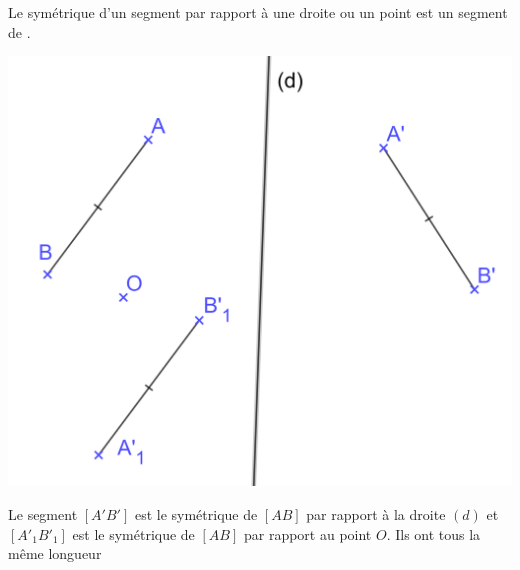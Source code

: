 \documentclass[xcolor={dvipsnames}]{beamer}
\begin{document}
\begin{frame}
	\begin{myprop}
		Le symétrique d'un segment par rapport à  \pause une droite ou un point est \pause un segment de . \pause
	\end{myprop}
	
	\begin{myex}
		\begin{center}
			\includegraphics[scale=0.07]{sym_seg}
		\end{center}
		
		Le segment $[A'B']$ est le symétrique de $[AB]$ par rapport à \pause la droite $(d)$ et $[A'_1B'_1]$ est \pause le symétrique de $[AB]$ par rapport au point $O$. \pause
		Ils ont tous la même longueur
		
		
	\end{myex}
\end{frame}
\end{document}
